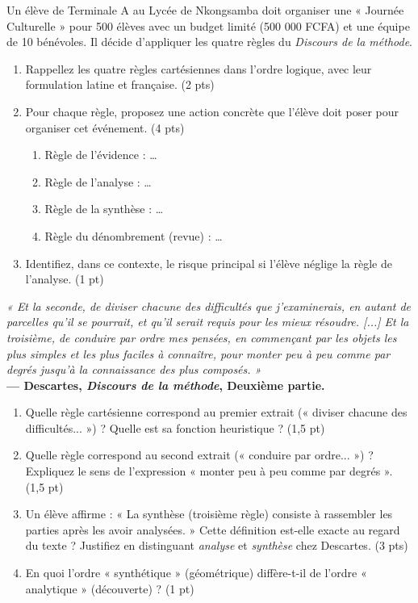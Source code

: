\documentclass[11pt]{article}
\begin{document}
\begin{exercice}
Un élève de Terminale A au Lycée de Nkongsamba doit organiser une « Journée Culturelle » pour 500 élèves avec un budget limité (500 000 FCFA) et une équipe de 10 bénévoles. Il décide d'appliquer les quatre règles du \textit{Discours de la méthode}.
\begin{enumerate}
    \item Rappellez les quatre règles cartésiennes dans l'ordre logique, avec leur formulation latine et française. (2 pts)
    \item Pour chaque règle, proposez une action concrète que l'élève doit poser pour organiser cet événement. (4 pts)
    \begin{enumerate}
        \item Règle de l'évidence : \dots
        \item Règle de l'analyse : \dots
        \item Règle de la synthèse : \dots
        \item Règle du dénombrement (revue) : \dots
    \end{enumerate}
    \item Identifiez, dans ce contexte, le risque principal si l'élève néglige la règle de l'analyse. (1 pt)
\end{enumerate}
\end{exercice}

\begin{exercice}
\textit{« Et la seconde, de diviser chacune des difficultés que j'examinerais, en autant de parcelles qu'il se pourrait, et qu'il serait requis pour les mieux résoudre. [...] Et la troisième, de conduire par ordre mes pensées, en commençant par les objets les plus simples et les plus faciles à connaître, pour monter peu à peu comme par degrés jusqu'à la connaissance des plus composés. »} \\
\textbf{— Descartes, \textit{Discours de la méthode}, Deuxième partie.}
\begin{enumerate}
    \item Quelle règle cartésienne correspond au premier extrait (« diviser chacune des difficultés... ») ? Quelle est sa fonction heuristique ? (1,5 pt)
    \item Quelle règle correspond au second extrait (« conduire par ordre... ») ? Expliquez le sens de l'expression « monter peu à peu comme par degrés ». (1,5 pt)
    \item Un élève affirme : « La synthèse (troisième règle) consiste à rassembler les parties après les avoir analysées. » Cette définition est-elle exacte au regard du texte ? Justifiez en distinguant \textit{analyse} et \textit{synthèse} chez Descartes. (3 pts)
    \item En quoi l'ordre « synthétique » (géométrique) diffère-t-il de l'ordre « analytique » (découverte) ? (1 pt)
\end{enumerate}
\end{exercice}
\end{document}
